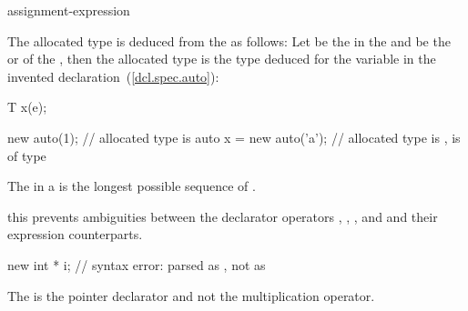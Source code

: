 \begin{ncsimplebnf}
\terminal{(} assignment-expression \terminal{)}
\end{ncsimplebnf}

The allocated type is deduced from the  as
follows: Let  be the  in the  and
 be the  or  of
the , then the allocated type is the type
deduced for the variable  in the invented
declaration~(\ref{dcl.spec.auto}):

\begin{codeblock}
T x(e);
\end{codeblock}

\begin{example}
\begin{codeblock}
new auto(1);                    // allocated type is 
auto x = new auto('a');         // allocated type is ,  is of type 
\end{codeblock}
\end{example}

\pnum
The  in a  is the longest
possible sequence of .
\begin{note}
this prevents ambiguities between the declarator operators \tcode{\&}, \tcode{\&\&},
\tcode{*}, and \tcode{[]} and their expression counterparts.
\end{note}
\begin{example}

\begin{codeblock}
new int * i;                    // syntax error: parsed as , not as 
\end{codeblock}
The \tcode{*} is the pointer declarator and not the multiplication
operator.
\end{example}

